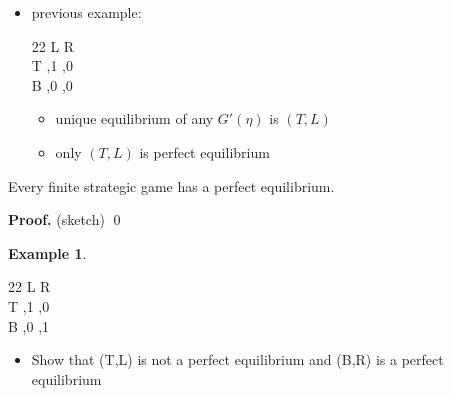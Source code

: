 \documentclass[compress]{beamer}    %
\theoremstyle{plain}
\theoremstyle{definition}
\newtheorem{ex}{Example}
\begin{document}
{\begin{itemize}
\item previous example:
   \begin{table}[h]
\centering
 \begin{game}{2}{2}
      \> L    \>  R\\%
T   ,1    ,0  \\
B   ,0    ,0  
\end{game}
\end{table}
  \begin{itemize}
  \item unique equilibrium of any $G'(\eta)$ is $(T,L)$
  \item only $(T,L)$ is perfect equilibrium
  \end{itemize}
\end{itemize}

\framebreak

\begin{theorem}
  Every finite strategic game has a perfect equilibrium.
\end{theorem}
\textbf{Proof. } (sketch)%
\qed

\framebreak

\begin{ex}
  \begin{table}[h]
\centering
 \begin{game}{2}{2}
      \> L    \>  R\\%
T   ,1    ,0  \\
B   ,0    ,1  
\end{game}
\end{table}
\begin{itemize}
\item Show that (T,L) is not a perfect equilibrium and (B,R) is a perfect equilibrium
\end{itemize}
\end{ex}

}
\end{document}
